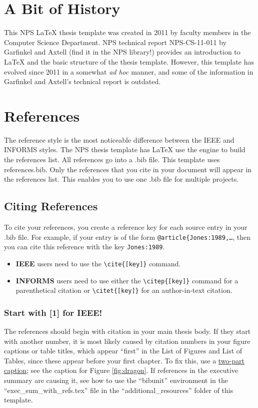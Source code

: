 \section{A Bit of History}

This NPS \LaTeX{} thesis template was created in 2011 by faculty members in the Computer Science Department. NPS technical report NPS-CS-11-011 by Garfinkel and Axtell (find it in the NPS library!) provides an introduction to \LaTeX{} and the basic structure of the thesis template. However, this template has evolved since 2011 in a somewhat {\it ad hoc} manner, and some of the information in Garfinkel and Axtell's technical report is outdated.

\section{References}
The reference style is the most noticeable difference between the IEEE and INFORMS styles.
The NPS thesis template has \LaTeX{} use the \BibTeX{} engine to build the references list.
All references go into a .bib file.  This template uses references.bib.  Only the references that you cite in your document will appear in the references list.  This enables you to use one .bib file for multiple projects.

\subsection{Citing References}
To cite your references, you create a reference key for each source entry in your .bib file.  For example, if your \BibTeX{} entry is of the form {\tt @article\{Jones:1989,\dots}, then you can cite this reference with the key {\tt Jones:1989}.
\begin{itemize}
    \item \textbf{IEEE} users need to use the \verb|\cite{[key]}| command.
    \item \textbf{INFORMS} users need to use either the \verb|\citep{[key]}| command for a parenthetical citation or \verb|\citet{[key]}| for an author-in-text citation.
\end{itemize}

\ifinforms
\else
\let\citep\cite
\let\citet\cite
\fi

\subsubsection{Start with [1] for IEEE!}\label{sec:firstone}
The references should begin with citation \citep{pollan_2006} in your main thesis body. If they start with another number, it is most likely caused by citation numbers in your figure captions or table titles, which appear ``first'' in the List of Figures and List of Tables, since these appear before your first chapter. To fix this, use a \underline{two-part caption}; see the caption for Figure \ref{fig:dragon}. If references in the executive summary are causing it, see how to use the ``bibunit'' environment in the ``exec\_sum\_with\_refs.tex'' file in the ``additional\_resources'' folder of this template.

